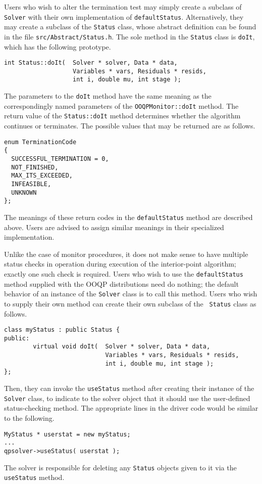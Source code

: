 Users who wish to alter the termination test may
simply create a subclass of {\tt Solver} with their own implementation
of {\tt defaultStatus}. Alternatively, they may create a subclass of
the {\tt Status} class, whose abstract definition can be found in the
file {\tt src/Abstract/Status.h}. The sole method in the {\tt Status}
class is \texttt{doIt}, which has the following prototype.
\begin{verbatim}
int Status::doIt(  Solver * solver, Data * data, 
                   Variables * vars, Residuals * resids,
                   int i, double mu, int stage );
\end{verbatim}
The parameters to the \texttt{doIt} method have the same meaning as
the correspondingly named parameters of the \texttt{OOQPMonitor::doIt}
method. The return value of the \texttt{Status::doIt} method
determines whether the algorithm continues or terminates. The possible
values that may be returned are as follows.
\begin{verbatim}
enum TerminationCode 
{
  SUCCESSFUL_TERMINATION = 0,
  NOT_FINISHED,
  MAX_ITS_EXCEEDED,
  INFEASIBLE,
  UNKNOWN
};
\end{verbatim}
The meanings of these return codes in the {\tt defaultStatus} method
are described above. Users are advised to assign similar meanings in
their specialized implementation. 

Unlike the case of monitor procedures, it does not make sense to have
multiple status checks in operation during execution of the
interior-point algorithm; exactly one such check is required.  Users
who wish to use the {\tt defaultStatus} method supplied with the OOQP
distributions need do nothing; the default behavior of an instance of
the {\tt Solver} class is to call this method. Users who wish to
supply their own method can create their own subclass of the {\tt
  Status} class as follows.
\begin{verbatim}
class myStatus : public Status {
public:
        virtual void doIt(  Solver * solver, Data * data, 
                            Variables * vars, Residuals * resids,
                            int i, double mu, int stage );
};
\end{verbatim}
Then, they can invoke the {\tt useStatus} method after creating their
instance of the {\tt Solver} class, to indicate to the solver object
that it should use the user-defined status-checking method. The
appropriate lines in the driver code would be similar to the
following.
\begin{verbatim}
MyStatus * userstat = new myStatus;
...
qpsolver->useStatus( userstat );
\end{verbatim}
The solver is responsible for deleting any \texttt{Status} objects
given to it via the \texttt{useStatus} method.




